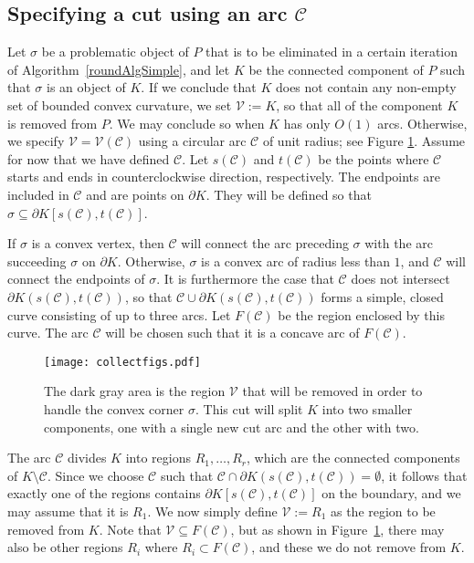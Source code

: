 \documentclass{article}
\newcommand{\PP}{P}
\newcommand{\KO}{K}
\newcommand{\se}{\sigma}
\newcommand{\VV}{\mathcal V}
\newcommand{\cutreg}{F}
\newcommand{\cut}{\mathcal C}
\newcommand{\start}{s}
\newcommand{\terminal}{t}
\newcommand{\mydef}{:=}
\begin{document}
\subsection{Specifying a cut using an arc $\cut$}\label{sec:specifying}

Let $\se$ be a problematic object of $\PP$ 
that is to be eliminated in a certain iteration of Algorithm~\ref{roundAlgSimple}, and let $\KO$ be the connected component of $\PP$ such that $\se$ is an object of $\KO$.
If we conclude that $\KO$ does not contain any non-empty set of
bounded convex curvature, we set $\VV\mydef \KO$, so that all of the component $\KO$ is removed from
$\PP$.
We may conclude so when $\KO$ has only $O(1)$ arcs.
Otherwise, we specify $\VV=\VV(\cut)$ using a circular arc $\cut$
of unit radius; see Figure \ref{cutFig}.
Assume for now that we have defined $\cut$.
Let $\start(\cut)$ and $\terminal(\cut)$ be the points where $\cut$ starts
and ends in counterclockwise direction, respectively.
The endpoints are included in $\cut$ and
are points on $\partial \KO$.
They will be defined so that $\se\subseteq \partial\KO[\start(\cut),\terminal(\cut)]$.

If $\se$ is a convex vertex, then $\cut$ will connect the arc preceding $\se$ with the arc succeeding $\se$ on $\partial\KO$.
Otherwise, $\se$ is a convex arc of radius less than $1$, and $\cut$ will connect the endpoints of $\se$.
It is furthermore the case that $\cut$ does not intersect $\partial\KO(\start(\cut),\terminal(\cut))$, so that $\cut\cup \partial\KO(\start(\cut),\terminal(\cut))$ forms a simple, closed curve consisting of up to three arcs.
Let $\cutreg(\cut)$ be the region enclosed by this curve.
The arc $\cut$ will be chosen such that it is a concave arc of $\cutreg(\cut)$.

\begin{figure}
\centering
\texttt{[image: collectfigs.pdf]}
\caption{
The dark gray area is the region $\VV$ that will be removed in order to handle the convex corner $\se$.
This cut will split $\KO$ into two smaller components, one with a single new cut arc and the other with two.
}
\label{cutFig}
\end{figure}

The arc $\cut$ divides $\KO$ into regions $R_1,\ldots,R_r$, which are
the connected components of $\KO\setminus\cut$.
Since we choose $\cut$ such that $\cut\cap \partial\KO(\start(\cut),\terminal(\cut))=\emptyset$, it follows that exactly one of the regions contains $\partial\KO[\start(\cut),\terminal(\cut)]$ on the boundary, and we may assume that it is $R_1$.
We now simply define $\VV\mydef R_1$ as the region to be removed from $\KO$.
Note that $\VV\subseteq\cutreg(\cut)$, but as shown in Figure~\ref{cutFig}, there may also be other regions $R_i$ where $R_i\subset\cutreg(\cut)$, and these we do not remove from $\KO$.
\end{document}
